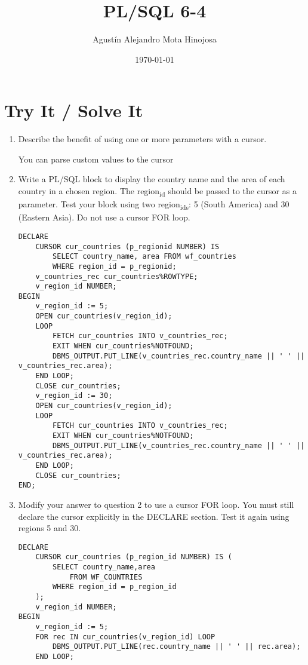 \documentclass[11pt]{article}
\author{Agustín Alejandro Mota Hinojosa}
\date{\today}
\title{PL/SQL 6-4}
\begin{document}
\maketitle
\tableofcontents

\section{Try It / Solve It}
\label{sec:orgd909e48}

\begin{enumerate}
\item Describe the benefit of using one or more parameters with a cursor.

You can parse custom values to the cursor

\item Write a PL/SQL block to display the country name and the area of each country in a chosen region. The region\textsubscript{id} should be passed to the cursor as a parameter. Test your block using two region\textsubscript{ids}: 5 (South America) and 30 (Eastern Asia). Do not use a cursor FOR loop.
\begin{verbatim}
DECLARE
    CURSOR cur_countries (p_regionid NUMBER) IS
        SELECT country_name, area FROM wf_countries
        WHERE region_id = p_regionid;
    v_countries_rec cur_countries%ROWTYPE;
    v_region_id NUMBER;
BEGIN
    v_region_id := 5;
    OPEN cur_countries(v_region_id);
    LOOP
        FETCH cur_countries INTO v_countries_rec;
        EXIT WHEN cur_countries%NOTFOUND;
        DBMS_OUTPUT.PUT_LINE(v_countries_rec.country_name || ' ' || v_countries_rec.area);
    END LOOP;
    CLOSE cur_countries;
    v_region_id := 30;
    OPEN cur_countries(v_region_id);
    LOOP
        FETCH cur_countries INTO v_countries_rec;
        EXIT WHEN cur_countries%NOTFOUND;
        DBMS_OUTPUT.PUT_LINE(v_countries_rec.country_name || ' ' || v_countries_rec.area);
    END LOOP;
    CLOSE cur_countries;
END;
\end{verbatim}

\item Modify your answer to question 2 to use a cursor FOR loop. You must still declare the cursor explicitly in the DECLARE section. Test it again using regions 5 and 30.
\begin{verbatim}
DECLARE
    CURSOR cur_countries (p_region_id NUMBER) IS (
        SELECT country_name,area
            FROM WF_COUNTRIES
        WHERE region_id = p_region_id
    );
    v_region_id NUMBER;
BEGIN
    v_region_id := 5;
    FOR rec IN cur_countries(v_region_id) LOOP
        DBMS_OUTPUT.PUT_LINE(rec.country_name || ' ' || rec.area);
    END LOOP;


\end{verbatim}
\end{enumerate}
\end{document}
